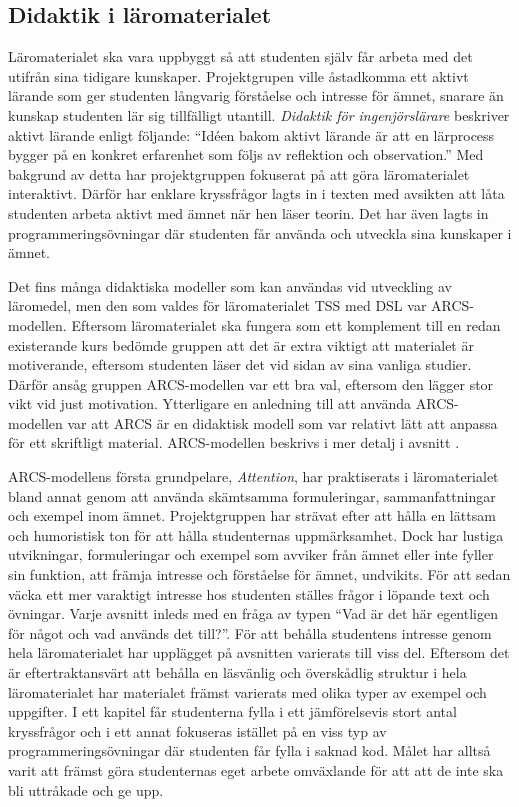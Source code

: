 \documentclass[12pt,a4paper,twoside,openright]{article}
\begin{document}
\subsection{Didaktik i läromaterialet}
\label{sec:matDidaktik}
Läromaterialet ska vara uppbyggt så att studenten själv får arbeta med
det utifrån sina tidigare kunskaper. Projektgrupen ville åstadkomma ett aktivt
lärande som ger studenten långvarig förståelse och intresse för ämnet,
snarare än kunskap studenten lär sig tillfälligt
utantill. \textit{Didaktik för ingenjörslärare}
\cite[s~236]{didaktik_for_ingenjorslarare} beskriver aktivt lärande enligt
följande: ``Idéen bakom aktivt lärande är att en lärprocess bygger på
en konkret erfarenhet som följs av reflektion och observation.'' Med
bakgrund av detta har projektgruppen fokuserat på att göra
läromaterialet interaktivt. Därför har enklare kryssfrågor lagts in i
texten med avsikten att låta studenten arbeta aktivt med ämnet när hen läser
teorin. Det har även lagts in programmeringsövningar där studenten
får använda och utveckla sina kunskaper i ämnet.

Det fins många didaktiska modeller som kan användas vid utveckling
av läromedel, men den som valdes för
läromaterialet TSS med DSL var ARCS-modellen. Eftersom
läromaterialet ska fungera som ett komplement till en
redan existerande kurs bedömde gruppen att det är extra viktigt att
materialet är motiverande, eftersom studenten läser det vid sidan av
sina vanliga studier. Därför ansåg gruppen ARCS-modellen var
ett bra val, eftersom den lägger stor vikt vid just motivation.
Ytterligare en anledning till att använda ARCS-modellen
var att ARCS är en didaktisk modell som var relativt lätt att 
anpassa för ett skriftligt material.
ARCS-modellen beskrivs i mer detalj i avsnitt .


ARCS-modellens första grundpelare, \textit{Attention}, har
praktiserats i läromaterialet bland annat genom att använda skämtsamma formuleringar,
sammanfattningar och exempel inom ämnet. Projektgruppen har strävat efter att
hålla en lättsam och humoristisk ton för att hålla studenternas
uppmärksamhet. Dock har lustiga utvikningar,
formuleringar och exempel som avviker från ämnet eller inte fyller sin
funktion, att främja intresse och förståelse för ämnet, undvikits. För att sedan
väcka ett mer varaktigt intresse hos studenten ställes frågor i
löpande text och övningar. Varje avsnitt inleds med en fråga av typen
``Vad är det här egentligen för något och vad används det till?''. För
att behålla studentens intresse genom hela läromaterialet har upplägget
på avsnitten varierats till viss del. Eftersom det är eftertraktansvärt att
behålla en läsvänlig och överskådlig struktur i hela läromaterialet
har materialet  främst varierats med olika typer av exempel
och uppgifter. I ett kapitel får studenterna fylla i ett jämförelsevis
stort antal kryssfrågor och i ett annat fokuseras istället
på en viss typ av programmeringsövningar där studenten får fylla i
saknad kod. Målet har alltså varit att främst göra studenternas eget arbete
omväxlande för att att de inte ska bli uttråkade och ge upp.
\end{document}
